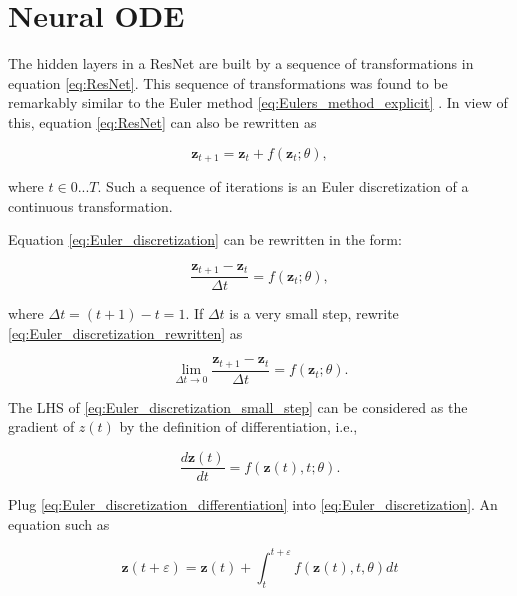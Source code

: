 \documentclass[
	parskip, 			   %
	twoside, 			   %
	DIV=14, 			   %
	BCOR=15.0mm, 		   %
	headsepline, 		   %
	open=right, 		   %
	captions=tableheading, %
	bibliography=totoc,    %
	numbers=noenddot       %
]{scrreprt}
\begin{document}
\section{Neural ODE}
The hidden layers in a ResNet are built by a sequence of transformations in equation \ref{eq:ResNet}. This sequence of transformations was found to be remarkably similar to the Euler method \ref{eq:Eulers_method_explicit} \cite{ruthotto2020deep}. In view of this, equation \ref{eq:ResNet} can also be rewritten as

\begin{equation}
    \label{eq:Euler_discretization}
    \mathbf{z}_{t+1} = \mathbf{z}_{t} + f(\mathbf{z}_{t}; \theta),
\end{equation}

where $t \in {0 ... T}$. Such a sequence of iterations is an Euler discretization of a continuous transformation.

Equation \ref{eq:Euler_discretization} can be rewritten in the form:

\begin{equation}
    \label{eq:Euler_discretization_rewritten}
    \frac{\mathbf{z}_{t+1}-\mathbf{z}_{t}}{\Delta t} = f(\mathbf{z}_{t}; \theta),
\end{equation}

where $\Delta t = (t+1)-t = 1$. If $\Delta t$ is a very small step, rewrite \ref{eq:Euler_discretization_rewritten} as

\begin{equation}
    \label{eq:Euler_discretization_small_step}
    \lim_{\Delta t \to 0} \frac{\mathbf{z}_{t+1}-\mathbf{z}_{t}}{\Delta t} = f(\mathbf{z}_{t}; \theta).
\end{equation}

The LHS of \ref{eq:Euler_discretization_small_step} can be considered as the gradient of $z(t)$ by the definition of differentiation, i.e.,

\begin{equation}
    \label{eq:Euler_discretization_differentiation}
    \frac{d\mathbf{z}(t)}{dt} = f(\mathbf{z}(t), t; \theta).
\end{equation}

Plug \ref{eq:Euler_discretization_differentiation} into \ref{eq:Euler_discretization}. An equation such as 

\begin{equation}
    \label{eq:Neural_ODE}
    \mathbf{z}(t+\varepsilon ) = \mathbf{z}(t) + \int_{t}^{t+\varepsilon } f(\mathbf{z}(t), t, \theta)dt
\end{equation}
\end{document}
